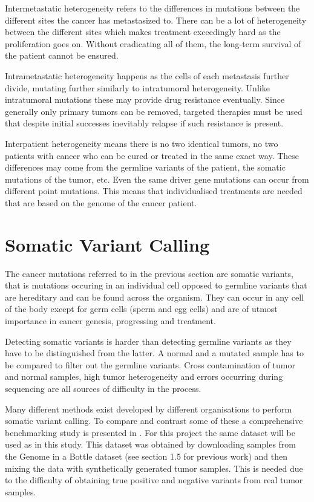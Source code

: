 \documentclass[bsc,frontabs,singlespacing,parskip,deptreport]{infthesis}
\begin{document}
Intermetastatic heterogeneity refers to the differences in mutations between the different sites the cancer has metastasized to. There can be a lot of heterogeneity between the different sites which makes treatment exceedingly hard as the proliferation goes on. Without eradicating all of them, the long-term survival of the patient cannot be ensured.

Intrametastatic heterogeneity happens as the cells of each metastasis further divide, mutating further similarly to intratumoral heterogeneity. Unlike intratumoral mutations these may provide drug resistance eventually. Since generally only primary tumors can be removed, targeted therapies must be used that despite initial successes inevitably relapse if such resistance is present.

Interpatient heterogeneity means there is no two identical tumors, no two patients with cancer who can be cured or treated in the same exact way. These differences may come from the germline variants of the patient, the somatic mutations of the tumor, etc. Even the same driver gene mutations can occur from different point mutations. This means that individualised treatments are needed that are based on the genome of the cancer patient.

\section{Somatic Variant Calling}

The cancer mutations referred to in the previous section are somatic variants, that is mutations occuring in an individual cell opposed to germline variants that are hereditary and can be found across the organism. They can occur in any cell of the body except for germ cells (sperm and egg cells) and are of utmost importance in cancer genesis, progressing and treatment.

Detecting somatic variants is harder than detecting germline variants as they have to be distinguished from the latter. A normal and a mutated sample has to be compared to filter out the germline variants. Cross contamination of tumor and normal samples, high tumor heterogeneity and errors occurring during sequencing are all sources of difficulty in the process.

Many different methods exist developed by different organisations to perform somatic variant calling. To compare and contrast some of these a comprehensive benchmarking study is presented in \cite{benchmark}. For this project the same dataset will be used as in this study. This dataset was obtained by downloading samples from the Genome in a Bottle dataset \cite{giab1} \cite{giab2} (see section 1.5 for previous work) and then mixing the data with synthetically generated tumor samples. This is needed due to the difficulty of obtaining true positive and negative variants from real tumor samples.
\end{document}
